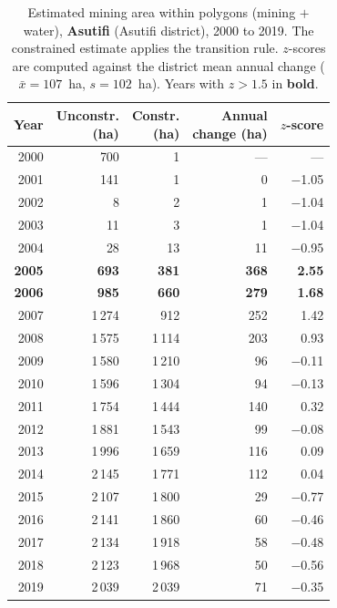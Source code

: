 \documentclass[]{interact}
\begin{document}
\begin{table}[H]
\centering
\caption{Estimated mining area within polygons (mining $+$ water), \textbf{Asutifi} (Asutifi district), 2000 to 2019. The constrained estimate applies the transition rule. $z$-scores are computed against the district mean annual change ($\bar{x} = 107$~ha, $s = 102$~ha). Years with $z > 1.5$ in \textbf{bold}.}
\label{tab:district_asutifi}
\small
\begin{tabular}{@{}rrrrr@{}}
\toprule
Year & \makecell[r]{Unconstr.\\(ha)} & \makecell[r]{Constr.\\(ha)} & \makecell[r]{Annual\\change (ha)} & $z$-score \\
\midrule
      2000 & 700 & 1 & --- & --- \\
      2001 & 141 & 1 & 0 & $-$1.05 \\
      2002 & 8 & 2 & 1 & $-$1.04 \\
      2003 & 11 & 3 & 1 & $-$1.04 \\
      2004 & 28 & 13 & 11 & $-$0.95 \\
      \textbf{2005} & \textbf{693} & \textbf{381} & \textbf{368} & \textbf{\phantom{$-$}2.55} \\
      \textbf{2006} & \textbf{985} & \textbf{660} & \textbf{279} & \textbf{\phantom{$-$}1.68} \\
      2007 & 1\,274 & 912 & 252 & \phantom{$-$}1.42 \\
      2008 & 1\,575 & 1\,114 & 203 & \phantom{$-$}0.93 \\
      2009 & 1\,580 & 1\,210 & 96 & $-$0.11 \\
      2010 & 1\,596 & 1\,304 & 94 & $-$0.13 \\
      2011 & 1\,754 & 1\,444 & 140 & \phantom{$-$}0.32 \\
      2012 & 1\,881 & 1\,543 & 99 & $-$0.08 \\
      2013 & 1\,996 & 1\,659 & 116 & \phantom{$-$}0.09 \\
      2014 & 2\,145 & 1\,771 & 112 & \phantom{$-$}0.04 \\
      2015 & 2\,107 & 1\,800 & 29 & $-$0.77 \\
      2016 & 2\,141 & 1\,860 & 60 & $-$0.46 \\
      2017 & 2\,134 & 1\,918 & 58 & $-$0.48 \\
      2018 & 2\,123 & 1\,968 & 50 & $-$0.56 \\
      2019 & 2\,039 & 2\,039 & 71 & $-$0.35 \\
\bottomrule
\end{tabular}
\end{table}
\end{document}
